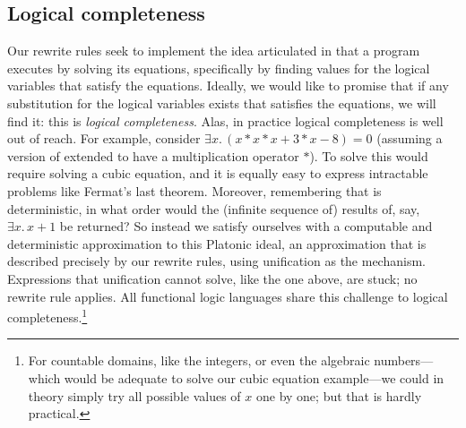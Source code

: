 \documentclass[acmsmall]{acmart}
\newcommand{\Varid}[1]{\mathit{#1}}
\begin{document}

\subsection{Logical completeness} \label{sec:local-subst}

Our rewrite rules seek to implement the idea articulated in  that
a program executes by solving its equations, specifically by finding values for the logical variables
that satisfy the equations.  Ideally, we would like to promise that if any substitution for the
logical variables exists that satisfies the equations, we will find it: this is \emph{logical completeness}.
Alas, in practice logical completeness is well out of reach.
For example, consider \ensuremath{\exists\Varid{x}.\,(\Varid{x}\mathbin{*}\Varid{x}\mathbin{*}\Varid{x}\mathbin{+}\mathrm{3}\mathbin{*}\Varid{x}\mathbin{-}\mathrm{8})\mathrel{=}\mathrm{0}} (assuming a version of \versecalc{} extended to have
a multiplication operator $*$).
To solve this would require solving a cubic
equation, and it is equally easy to express intractable problems like Fermat's last theorem.
Moreover, remembering that \versecalc{} is deterministic, in what order would the (infinite sequence of)
results of, say, \ensuremath{\exists\Varid{x}.\,\Varid{x}\mathbin{+}\mathrm{1}} be returned?
So instead we satisfy ourselves with a computable and deterministic approximation
to this Platonic ideal, an approximation that is described precisely by our rewrite rules, using unification as the
mechanism.  Expressions that unification cannot solve, like the one above, are stuck; no
rewrite rule applies.  All functional logic languages share this challenge to logical completeness.\footnote{For countable
domains, like the integers, or even the algebraic numbers---which would be adequate to solve our cubic equation example---we could
in theory simply try all possible values of \ensuremath{\Varid{x}} one by one; but that is hardly practical.}
\end{document}
